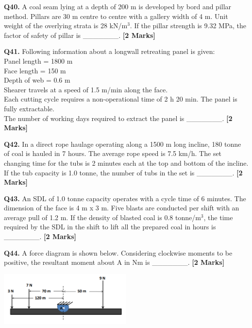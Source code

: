 \documentclass[11pt]{article}
\newcommand{\questionb}[2]{
    \noindent\textbf{Q#2.} #1 \hfill \textbf{[2 Marks]}
}
\begin{document}
\questionb{A coal seam lying at a depth of 200 m is developed by bord and pillar method. Pillars are 30 m centre to centre with a gallery width of 4 m. Unit weight of the overlying strata is 28 kN/m\(^3\). If the pillar strength is 9.32 MPa, the factor of safety of pillar is \_\_\_\_\_\_\_.}{40}
\vspace{0.5cm}

\questionb{Following information about a longwall retreating panel is given:\\
Panel length = 1800 m \\
Face length = 150 m \\
Depth of web = 0.6 m \\
Shearer travels at a speed of 1.5 m/min along the face.\\
Each cutting cycle requires a non-operational time of 2 h 20 min. The panel is fully extractable.\\
The number of working days required to extract the panel is \_\_\_\_\_\_\_.}{41}
\vspace{0.5cm}

\questionb{In a direct rope haulage operating along a 1500 m long incline, 180 tonne of coal is hauled in 7 hours. The average rope speed is 7.5 km/h. The set changing time for the tubs is 2 minutes each at the top and bottom of the incline. If the tub capacity is 1.0 tonne, the number of tubs in the set is \_\_\_\_\_\_\_.}{42}
\vspace{0.5cm}

\questionb{An SDL of 1.0 tonne capacity operates with a cycle time of 6 minutes. The dimension of the face is 4 m x 3 m. Five blasts are conducted per shift with an average pull of 1.2 m. If the density of blasted coal is 0.8 tonne/m\(^3\), the time required by the SDL in the shift to lift all the prepared coal in hours is \_\_\_\_\_\_\_.}{43}
\vspace{0.5cm}

\questionb{A force diagram is shown below. Considering clockwise moments to be positive, the resultant moment about A in Nm is \_\_\_\_\_\_\_.}{44}
\begin{center}
\includegraphics[width=0.5\textwidth]{figures/44.png}
\end{center}
\vspace{0.5cm}
\end{document}
